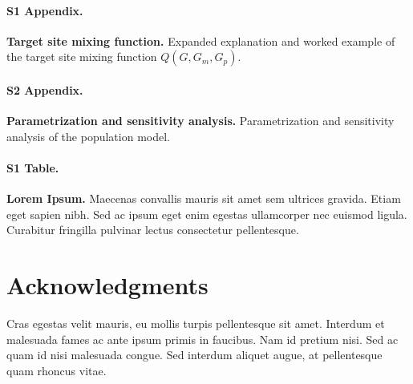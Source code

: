 \documentclass[10pt,letterpaper]{article}
\begin{document}
\paragraph*{S1 Appendix.}
\label{S1_Appendix}
{\bf Target site mixing function.} 
Expanded explanation and worked example of the target site mixing function $Q(G, G_m, G_p)$.

\paragraph*{S2 Appendix.}
\label{S2_Appendix}
{\bf Parametrization and sensitivity analysis.} 
Parametrization and sensitivity analysis of the population model. 

\paragraph*{S1 Table.}
\label{S1_Table}
{\bf Lorem Ipsum.} Maecenas convallis mauris sit amet sem ultrices gravida. Etiam eget sapien nibh. Sed ac ipsum eget enim egestas ullamcorper nec euismod ligula. Curabitur fringilla pulvinar lectus consectetur pellentesque.

\section*{Acknowledgments}
Cras egestas velit mauris, eu mollis turpis pellentesque sit amet. Interdum et malesuada fames ac ante ipsum primis in faucibus. Nam id pretium nisi. Sed ac quam id nisi malesuada congue. Sed interdum aliquet augue, at pellentesque quam rhoncus vitae.

\nolinenumbers

%
% 
%




% 

\end{document}
